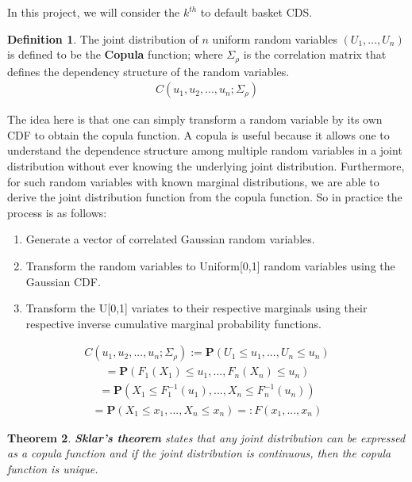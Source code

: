 \documentclass{report}
\theoremstyle{plain}
\newtheorem{thm}{Theorem}[chapter] %
\theoremstyle{definition}
\newtheorem{defn}[thm]{Definition} %
\begin{document}
In this project, we will consider the $k^{th}$ to default basket CDS.\\

\begin{defn}
	The joint distribution of $n$ uniform random variables $(U_1,...,U_n)$ is defined to be the \textbf{Copula} function; where $\Sigma_\rho$ is the correlation matrix that defines the dependency structure of the random variables.
	\begin{align*}
		C(u_1,u_2,...,u_n;\Sigma_\rho)
	\end{align*}
\end{defn}

The idea here is that one can simply transform a random variable by its own CDF to obtain the copula function. A copula is useful because it allows one to understand the dependence structure among multiple random variables in a joint distribution without ever knowing the underlying joint distribution. Furthermore, for such random variables with known marginal distributions,  we are able to derive the joint distribution function from the copula function. So in practice the process is as follows:

\begin{enumerate}
	\item Generate a vector of correlated Gaussian random variables.
	\item Transform the random variables to Uniform[0,1] random variables using the Gaussian CDF.
	\item Transform the U[0,1] variates to their respective marginals using their respective inverse cumulative marginal probability functions.
\end{enumerate}

\begin{align*}
C(u_1,u_2,...,u_n;\Sigma_\rho) := \mathbf{P}(U_1 \leq u_1,...,U_n \leq u_n)
\end{align*}
\begin{align*}
= \mathbf{P}(F_1(X_1) \leq u_1,...,F_n(X_n) \leq u_n)
\end{align*}
\begin{align*}
= \mathbf{P}(X_1 \leq F_1^{-1}(u_1),...,X_n \leq F_n^{-1}(u_n))
\end{align*}
\begin{align*}
= \mathbf{P}(X_1 \leq x_1,...,X_n \leq x_n) =: F(x_1,...,x_n)
\end{align*}

\begin{thm}
	\textbf{Sklar's theorem} states that any joint distribution can be expressed as a copula function and if the joint distribution is continuous, then the copula function is unique. 
\end{thm}
\end{document}
